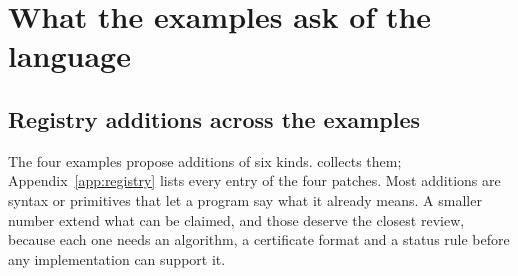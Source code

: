 \documentclass[11pt]{article}
\theoremstyle{definition}
\theoremstyle{plain}
\begin{document}
\section{What the examples ask of the language}\label{sec:synthesis}

\subsection{Registry additions across the examples}

The four examples propose additions of six kinds.  collects them;
Appendix~\ref{app:registry} lists every entry of the four patches. Most additions are syntax or
primitives that let a program say what it already means. A smaller number extend what can be
claimed, and those deserve the closest review, because each one needs an algorithm, a certificate
format and a status rule before any implementation can support it.
\end{document}
